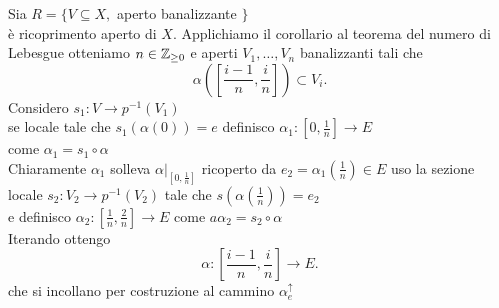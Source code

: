 \documentclass[12px]{article}
\begin{document}
\begin{dimo}
	Sia $R= \{V\subseteq X,$ aperto banalizzante  $\}$\\
	è ricoprimento aperto di  $X.$ Applichiamo il corollario al teorema del numero di Lebesgue otteniamo $n\in \mathbb{Z}_{\geq 0}$ e aperti  $V_1,\ldots,V_n$ banalizzanti tali che 
	\[
		\alpha([\frac{ i-1}n, \frac in])\subset V_i
	.\] 
	Considero $s_1: V \rightarrow p^{-1}(V_1)$\\
	se locale tale che $s_1(\alpha(0)) =e$ definisco $\alpha_1: [0,\frac 1n] \rightarrow E$\\
	come $\alpha_1 = s_1\circ \alpha$ \\
	Chiaramente $\alpha_1$ solleva $\alpha|_{[0,\frac 1n]}$ ricoperto da  $e_2 = \alpha_1(\frac 1n)\in E$ uso la sezione locale $s_2: V_2 \rightarrow p^{-1}(V_2)$ tale che $s(\alpha(\frac 1n)) = e_2$\\
	e definisco $\alpha_2: [\frac 1n, \frac 2n] \rightarrow E$ come $a\alpha_2 = s_2\circ \alpha$\\
Iterando ottengo
\[
	\alpha : [\frac {i-1}n,\frac in] \rightarrow E
.\] 
che si incollano per costruzione al cammino $\alpha^\uparrow_e$
\end{dimo}
\end{document}
